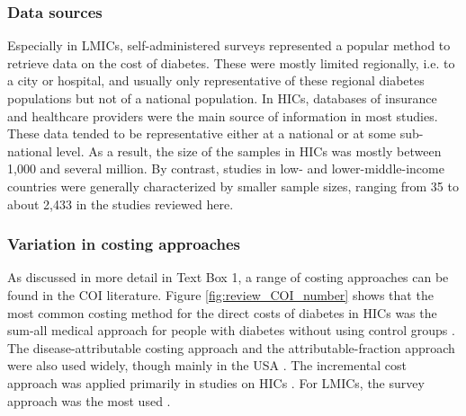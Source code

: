 \subsubsection*{Data sources}
Especially in \acp{LMIC}, self-administered surveys represented a popular method to retrieve data on the cost of diabetes. These were mostly limited regionally, i.e. to a city or hospital, and usually only representative of these regional diabetes populations but not of a national population. In \acp{HIC}, databases of insurance and healthcare providers were the main source of information in most studies. These data tended to be representative either at a national or at some sub-national level. As a result, the size of the samples in \acp{HIC} was mostly between 1,000 and several million. By contrast, studies in low- and lower-middle-income countries were generally characterized by smaller sample sizes, ranging from 35 \parencite{Suleiman2006} to about 2,433 \parencite{Yang2012} in the studies reviewed here.

\subsubsection*{Variation in costing approaches}
As discussed in more detail in Text Box 1, a range of costing approaches can be found in the \ac{COI} literature. Figure \ref{fig:review_COI_number} shows that the most common costing method for the direct costs of diabetes in \acp{HIC} was the sum-all medical approach for people with diabetes without using control groups \parencite{Kirigia2009,Boutayeb2014,Barcelo2003,Jonsson2002b,Ohinmaa2004,Lau2011a,Pohar2007,Gonzalez2009b,Horak2009,Martin2007b,Nolan2006c,Lucioni2003,Morsanutto2006b,Nakamura2008,Arredondo2004,Arredondo2007,Arredondo2005a,Arredondo2011b,Redekop2002b,Bjegovic2007b,Oliva2004a,Ringborg2008a,Chi2011a,Zhou2005a,Condliffe2014,Brandle2003d,Peele2002a,Lee2006,Maciejewski2004}. The disease-attributable costing approach \parencite{Suleiman2006,Abdulkadri2009b,Davis2006b,Simpson2003,RodriguezBolanos2010a,Solli2010a,Ballesta2006,Mata2002a,Lin2004,Dall2003a,Buescher2010,Tunceli2010c,Johnson2006d,Honkasalo2014,Bastida2002} and the attributable-fraction approach were also used widely, though mainly in the USA \parencite{AmericalDiabetesAssociation2008,Dawson2002b,Schmitt-Koopmann2004b,Dall2010,Bolin2009d,Honeycutt2009a,Lesniowska2014}. The incremental cost approach was applied primarily in studies on \acp{HIC} \parencite{Smith-Spangler2012,Yang2012,Tunceli2010c,Honeycutt2009a,Pohar2007a,Ricordeau2003,Koster2011c,Koster2006c,Koster2012,Esteghamati2009,Chodick2005a,Marchesini2011b,Bruno2012,Norlund2001a,Wirehn2008b,Birnbaum2003c,Durden2009b,Rodbard2010b,Oconnell2012,Trogdon2008a,Ramsey2002a,VanderLinden2009c}.  For \acp{LMIC}, the survey approach was the most used \parencite{Wang2009b,Wang2009f,Chan2007a,Ramachandran2007d,Javanbakht2011b,Khowaja2007a,Biorac2009a,Elrayah-Eliadarous2010b,Chatterjee2011c,Al-Maskari2010c,Druss2001,Tharkar2010a,Wang2010c}.


